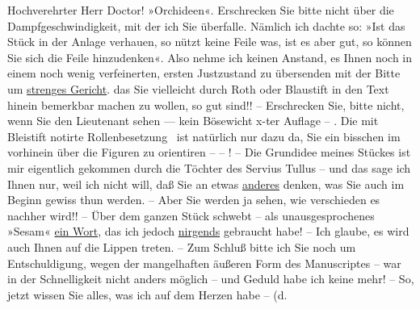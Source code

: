 \pstart{}Hochverehrter Herr Doctor!\pend\vspace{0.5em}
\pstart
           \label{K_L03710-1v}\label{K_L03710-1} »Orchideen«. Erschrecken Sie bitte nicht über die
               Dampfgeschwindigkeit, mit der ich Sie überfalle. Nämlich ich dachte so: »Ist das Stück in der Anlage verhauen,
               so nützt keine Feile was, ist es aber gut, so können Sie sich die Feile hinzudenken«.
               Also nehme ich keinen Anstand, es Ihnen noch in einem noch wenig verfeinerten, ersten
               Justzustand zu übersenden mit der Bitte um \uline{strenges
                  Gericht}. das Sie vielleicht durch Roth oder Blaustift in den Text hinein
               bemerkbar machen {\pb}zu wollen, so gut sind!! – Erschrecken Sie, bitte
               nicht, wenn Sie den Lieutenant sehen — kein Bösewicht x-ter Auflage – . Die mit
               Bleistift notirte Rollenbesetzung  ist natürlich nur dazu da, Sie ein bisschen im
               vorhinein über die Figuren zu orientiren – – ! – Die Grundidee meines Stückes ist \introOben{}mir\introOben{} eigentlich gekommen
               durch die Töchter des Servius Tullus – und das
               sage ich Ihnen nur, weil ich nicht will, daß Sie an etwas \uline{anderes} denken, was Sie auch im Beginn gewiss thun werden. – Aber Sie werden
               ja sehen, wie verschieden es nachher wird!! – Über dem ganzen Stück schwebt – als unausgesprochenes
               »Sesam« \uline{ein Wort}, das ich jedoch \uline{nirgends} gebraucht habe! – Ich glaube, es wird auch {\pb}Ihnen
               auf die Lippen treten. – Zum Schluß bitte ich Sie noch um Entschuldigung, wegen der
               mangelhaften äußeren Form des Manuscriptes – war in der Schnelligkeit nicht anders möglich – und Geduld
               habe ich keine mehr! – So, jetzt wissen Sie alles, was ich auf dem Herzen habe – (d.
